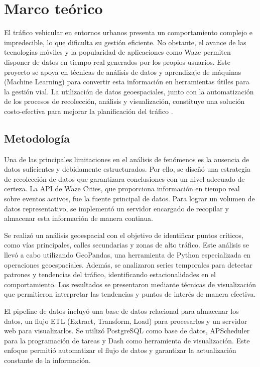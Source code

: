 \documentclass[12pt]{article}
\begin{document}
\section{Marco teórico}

El tráfico vehicular en entornos urbanos presenta un comportamiento complejo e impredecible, lo que dificulta su gestión eficiente. No obstante, el avance de las tecnologías móviles y la popularidad de aplicaciones como Waze permiten disponer de datos en tiempo real generados por los propios usuarios. Este proyecto se apoya en técnicas de análisis de datos y aprendizaje de máquinas (Machine Learning) para convertir esta información en herramientas útiles para la gestión vial. La utilización de datos geoespaciales, junto con la automatización de los procesos de recolección, análisis y visualización, constituye una solución costo-efectiva para mejorar la planificación del tráfico \parencite{barcelo2005}.

\subsection{Metodología}

Una de las principales limitaciones en el análisis de fenómenos es la ausencia de datos suficientes y debidamente estructurados. Por ello, se diseñó una estrategia de recolección de datos que garantizara conclusiones con un nivel adecuado de certeza. La API de Waze Cities, que proporciona información en tiempo real sobre eventos activos, fue la fuente principal de datos. Para lograr un volumen de datos representativo, se implementó un servidor encargado de recopilar y almacenar esta información de manera continua.

Se realizó un análisis geoespacial con el objetivo de identificar puntos críticos, como vías principales, calles secundarias y zonas de alto tráfico. Este análisis se llevó a cabo utilizando GeoPandas, una herramienta de Python especializada en operaciones geoespaciales. Además, se analizaron series temporales para detectar patrones y tendencias del tráfico, identificando estacionalidades en el comportamiento. Los resultados se presentaron mediante técnicas de visualización que permitieron interpretar las tendencias y puntos de interés de manera efectiva.

El pipeline de datos incluyó una base de datos relacional para almacenar los datos, un flujo ETL (Extract, Transform, Load) para procesarlos y un servidor web para visualizarlos. Se utilizó PostgreSQL como base de datos, APScheduler para la programación de tareas y Dash como herramienta de visualización. Este enfoque permitió automatizar el flujo de datos y garantizar la actualización constante de la información.
\end{document}
